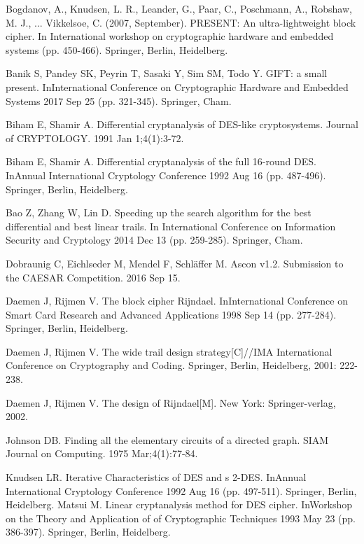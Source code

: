 \begin{thebibliography}{8}
Bogdanov, A., Knudsen, L. R., Leander, G., Paar, C., Poschmann, A., Robshaw, M. J., ...  Vikkelsoe, C. (2007, September). PRESENT: An ultra-lightweight block cipher. In International workshop on cryptographic hardware and embedded systems (pp. 450-466). Springer, Berlin, Heidelberg.

Banik S, Pandey SK, Peyrin T, Sasaki Y, Sim SM, Todo Y. GIFT: a small present. InInternational Conference on Cryptographic Hardware and Embedded Systems 2017 Sep 25 (pp. 321-345). Springer, Cham.

Biham E, Shamir A. Differential cryptanalysis of DES-like cryptosystems. Journal of CRYPTOLOGY. 1991 Jan 1;4(1):3-72.

Biham E, Shamir A. Differential cryptanalysis of the full 16-round DES. InAnnual International Cryptology Conference 1992 Aug 16 (pp. 487-496). Springer, Berlin, Heidelberg.

Bao Z, Zhang W, Lin D. Speeding up the search algorithm for the best differential and best linear trails. In International Conference on Information Security and Cryptology 2014 Dec 13 (pp. 259-285). Springer, Cham.

Dobraunig C, Eichlseder M, Mendel F, Schläffer M. Ascon v1.2. Submission to the CAESAR Competition. 2016 Sep 15.

Daemen J, Rijmen V. The block cipher Rijndael. InInternational Conference on Smart Card Research and Advanced Applications 1998 Sep 14 (pp. 277-284). Springer, Berlin, Heidelberg.

Daemen J, Rijmen V. The wide trail design strategy[C]//IMA International Conference on Cryptography and Coding. Springer, Berlin, Heidelberg, 2001: 222-238.

Daemen J, Rijmen V. The design of Rijndael[M]. New York: Springer-verlag, 2002.

Johnson DB. Finding all the elementary circuits of a directed graph. SIAM Journal on Computing. 1975 Mar;4(1):77-84.

Knudsen LR. Iterative Characteristics of DES and s 2-DES. InAnnual International Cryptology Conference 1992 Aug 16 (pp. 497-511). Springer, Berlin, Heidelberg.
Matsui M. Linear cryptanalysis method for DES cipher. InWorkshop on the Theory and Application of of Cryptographic Techniques 1993 May 23 (pp. 386-397). Springer, Berlin, Heidelberg.


\end{thebibliography}
